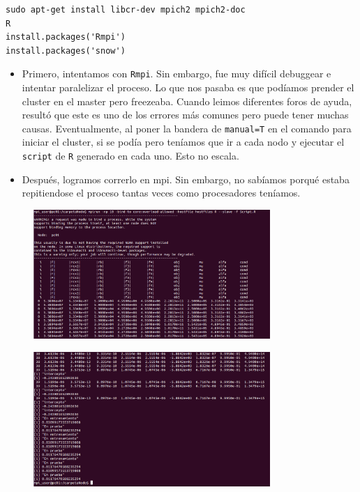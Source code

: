 \documentclass[]{article}
\begin{document}
\begin{verbatim}
sudo apt-get install libcr-dev mpich2 mpich2-doc
R
install.packages('Rmpi')
install.packages('snow')
\end{verbatim}

\begin{itemize}
\itemsep1pt\parskip0pt
\item
  Primero, intentamos con \texttt{Rmpi}. Sin embargo, fue muy difícil
  debuggear e intentar paralelizar el proceso. Lo que nos pasaba es que
  podíamos prender el cluster en el master pero freezeaba. Cuando leimos
  diferentes foros de ayuda, resultó que este es uno de los errores más
  comunes pero puede tener muchas causas. Eventualmente, al poner la
  bandera de \texttt{manual=T} en el comando para iniciar el cluster, si
  se podía pero teníamos que ir a cada nodo y ejecutar el
  \texttt{script} de \texttt{R} generado en cada uno. Esto no escala.
\item
  Después, logramos correrlo en mpi. Sin embargo, no sabíamos porqué
  estaba repitiendose el proceso tantas veces como procesadores
  teníamos.
\end{itemize}

\begin{figure}[H]
\centering
\includegraphics[width=0.8\textwidth]{img/svm_paralelo_mal_p1.png}

\end{figure}

\begin{figure}[H]
\centering
\includegraphics[width=0.8\textwidth]{img/svm_paralelo_mal_p2.png}

\end{figure}
\end{document}
